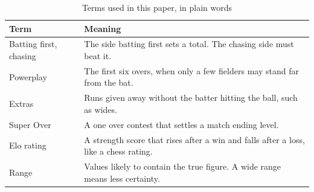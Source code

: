 \begin{table}[!t]
\caption{Terms used in this paper, in plain words}
\label{tab:glossary}
\centering
\footnotesize
\renewcommand{\arraystretch}{1.08}
\begin{tabular}{@{}p{}p{}@{}}
\toprule
\textbf{Term} & \textbf{Meaning} \\
\midrule
Batting first, chasing & The side batting first sets a total. The chasing side must beat it. \\
Powerplay & The first six overs, when only a few fielders may stand far from the bat. \\
Extras & Runs given away without the batter hitting the ball, such as wides. \\
Super Over & A one over contest that settles a match ending level. \\
Elo rating & A strength score that rises after a win and falls after a loss, like a chess rating. \\
Range & Values likely to contain the true figure. A wide range means less certainty. \\
\bottomrule
\end{tabular}
\end{table}
